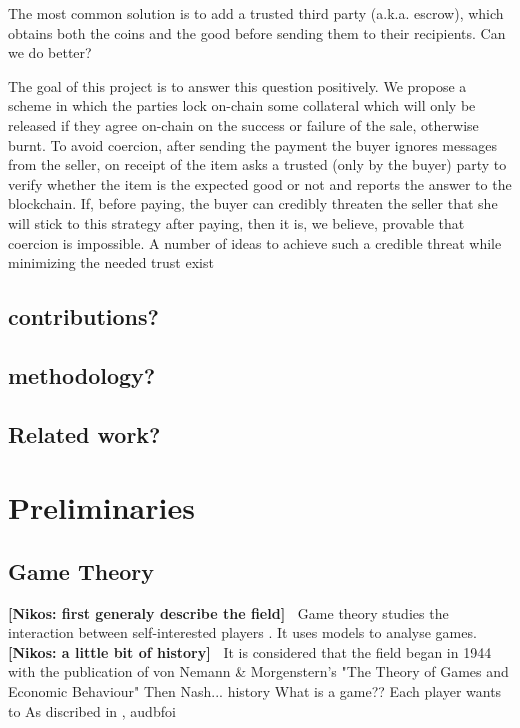 \documentclass{cacthesis}
\newcommand{\authnote}[3]{{ \footnotesize \textbf{#1[#2: #3]~}}}
\newcommand{\niknote}[1]{\authnote{\color{red}}{Nikos}{#1}}
\begin{document}
The most common solution is to add a trusted third party (a.k.a. escrow), which obtains both the coins and the good before sending them to their recipients. Can we do better?

The goal of this project is to answer this question positively. We propose a scheme in which the parties lock on-chain some collateral which will only be released if they agree on-chain on the success or failure of the sale, otherwise burnt. To avoid coercion, after sending the payment the buyer ignores messages from the seller, on receipt of the item asks a trusted (only by the buyer) party to verify whether the item is the expected good or not and reports the answer to the blockchain. If, before paying, the buyer can credibly threaten the seller that she will stick to this strategy after paying, then it is, we believe, provable that coercion is impossible. A number of ideas to achieve such a credible threat while minimizing the needed trust exist	\section{contributions?}
	\section{methodology?}
\section{Related work?}
\chapter{Preliminaries}
\section{Game Theory}
\niknote{first generaly describe the field}
Game theory studies the interaction between self-interested players \cite{leyton-brown_essentials_2008}. It uses models to analyse games.
\niknote{a little bit of history}
It is considered that the field began in 1944 with the publication of von Nemann \& Morgenstern's "The Theory of Games and Economic Behaviour" \cite{rasmusen_games_nodate,vonNeumannTheory} Then Nash... history   What is a game?? Each player wants to \cite{leyton-brown_essentials_2008-1} As discribed in \cite{kiayias_escrow_2017}, audbfoi
\end{document}

